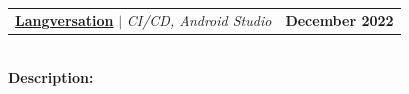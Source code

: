 \documentclass[letterpaper,11pt]{article}
\makeatletter
\newcommand{\resumeItem}[1]{
  \item\small{
    {#1 \vspace{-2pt}}
  }
}
\newcommand{\resumeProjectHeading}[2]{
    \item
    \begin{tabular*}{1.001\textwidth}{l@{\extracolsep{\fill}}r}
      \small#1 & \textbf{\small #2}\\
    \end{tabular*}\vspace{-7pt}
}
\newcommand{\resumeItemListStart}{\begin{itemize}}
\newcommand{\resumeItemListEnd}{\end{itemize}\vspace{-5pt}}
\makeatother
\begin{document}
\vspace{-10pt}

                
                            

    \resumeProjectHeading          {\textbf{\href{https://github.com/saiyakkshit/Langversation}{Langversation}} $|$ \emph{CI/CD, Android Studio \faGithub}}{December 2022}\\
          \vspace{6pt}
          \textbf{Description:}
         
\end{document}
